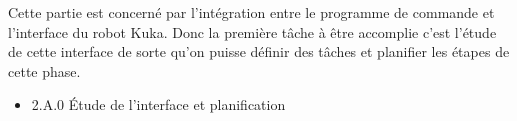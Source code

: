 

Cette partie est concerné par l’intégration entre le programme de commande et l’interface du robot Kuka. Donc la première tâche à être accomplie c’est l’étude de cette interface de sorte qu’on puisse définir des tâches et planifier les étapes de cette phase.
\begin{itemize}
\item 2.A.0 Étude de l’interface et planification

\end{itemize}